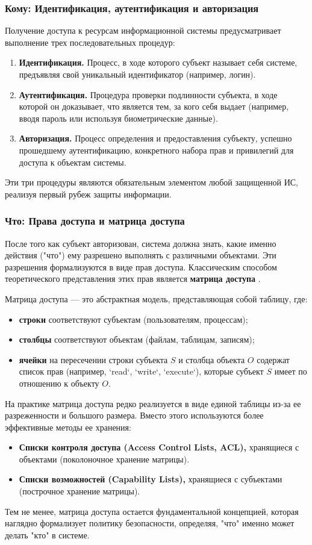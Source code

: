 \subsubsection{Кому: Идентификация, аутентификация и авторизация}
Получение доступа к ресурсам информационной системы предусматривает выполнение трех последовательных процедур:
\begin{enumerate}
	\item \textbf{Идентификация.} Процесс, в ходе которого субъект называет себя системе, предъявляя свой уникальный идентификатор (например, логин).
	\item \textbf{Аутентификация.} Процедура проверки подлинности субъекта, в ходе которой он доказывает, что является тем, за кого себя выдает (например, вводя пароль или используя биометрические данные).
	\item \textbf{Авторизация.} Процесс определения и предоставления субъекту, успешно прошедшему аутентификацию, конкретного набора прав и привилегий для доступа к объектам системы.
\end{enumerate}
Эти три процедуры являются обязательным элементом любой защищенной ИС, реализуя первый рубеж защиты информации.

\subsubsection{Что: Права доступа и матрица доступа}
После того как субъект авторизован, система должна знать, какие именно действия ("что") ему разрешено выполнять с различными объектами. Эти разрешения формализуются в виде прав доступа. Классическим способом теоретического представления этих прав является \textbf{матрица доступа} \autocite{Tanenbaum}.

Матрица доступа — это абстрактная модель, представляющая собой таблицу, где:
\begin{itemize}
    \item \textbf{строки} соответствуют субъектам (пользователям, процессам);
    \item \textbf{столбцы} соответствуют объектам (файлам, таблицам, записям);
    \item \textbf{ячейки} на пересечении строки субъекта $S$ и столбца объекта $O$ содержат список прав (например, `read`, `write`, `execute`), которые субъект $S$ имеет по отношению к объекту $O$.
\end{itemize}

На практике матрица доступа редко реализуется в виде единой таблицы из-за ее разреженности и большого размера. Вместо этого используются более эффективные методы ее хранения:
\begin{itemize}
    \item \textbf{Списки контроля доступа (Access Control Lists, ACL),} хранящиеся с объектами (поколоночное хранение матрицы).
    \item \textbf{Списки возможностей (Capability Lists),} хранящиеся с субъектами (построчное хранение матрицы).
\end{itemize}
Тем не менее, матрица доступа остается фундаментальной концепцией, которая наглядно формализует политику безопасности, определяя, "что" именно может делать "кто" в системе.

\clearpage
